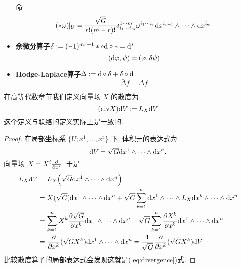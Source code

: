 \begin{itemize}
        命
        \begin{equation*}
            (*\omega)|_U=\frac{\sqrt{G}}{r!(m-r)!}\delta^{1\cdots m}_{i_1\cdots i_m}\omega^{i_1\cdots i_r}{\rm d}{x^{i_{r+1}}}\wedge\cdots\wedge{\rm d}{x^{i_m}}
        \end{equation*}
        \item \textbf{余微分算子}$\delta := (-1)^{mr+1}*\circ{\rm d}\circ*={\rm d}^*$
        \begin{equation*}
            ({\rm d}{\varphi},\psi)=(\varphi, \delta\psi)
        \end{equation*}
        \item \textbf{Hodge-Laplace算子}$\bar{\Delta}:={\rm d}\circ\delta+\delta\circ{\rm d}$
        \begin{equation*}
            \bar{\Delta}f=\Delta f
        \end{equation*}
    \end{itemize}

    \begin{proposition}
        在高等代数章节我们定义向量场 $X$ 的散度为 
        \begin{equation}\label{eq:divergence}
            (\mathrm{div}X){\rm d} V:= L_X{\rm d} V
        \end{equation}
        这个定义与联络的定义实际上是一致的.
    \end{proposition}
    \begin{proof}
        在局部坐标系 $\{U;x^1,\dots,x^n\}$ 下, 体积元的表达式为
        \begin{equation*}
            {\rm d} V = \sqrt{G}{\rm d} x^1\wedge\cdots\wedge{\rm d} x^n.
        \end{equation*}
        向量场 $X = X^i\frac{\partial }{\partial x^i}$. 于是
        \begin{align*}
            L_X{\rm d} V &= L_X\Big(\sqrt{G}{\rm d} x^1\wedge\cdots\wedge{\rm d} x^n\Big) \\
            &= X(\sqrt{G}){\rm d} x^1\wedge\cdots\wedge{\rm d} x^n + \sqrt{G}\sum_{k = 1}^{n}{\rm d} x^1\wedge\cdots\wedge L_X{\rm d} x^k\wedge\cdots\wedge{\rm d} x^n \\
            &= \sum_{k=1}^{n}X^k\frac{\partial \sqrt{G}}{\partial x^k}{\rm d} x^1\wedge\cdots\wedge{\rm d} x^n + \sqrt{G}\sum_{k = 1}^{n}\frac{\partial X^k}{\partial x^k}{\rm d} x^1\wedge\cdots\wedge{\rm d} x^n \\
            &= \frac{\partial }{\partial x^k}(\sqrt{G}X^k){\rm d} x^1\wedge\cdots\wedge{\rm d} x^n = \frac{1}{\sqrt{G}}\frac{\partial }{\partial x^k}(\sqrt{G}X^k){\rm d} V
        \end{align*}
        比较散度算子的局部表达式会发现这就是(\ref{eq:divergence})式.
    \end{proof}
